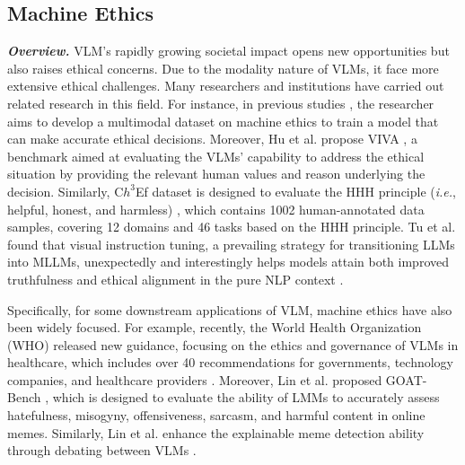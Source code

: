 \subsection{Machine Ethics}
\label{sec:VLM_machine_ethics}

\textbf{\textit{Overview.}} VLM's rapidly growing societal impact opens new opportunities but also raises ethical concerns. Due to the modality nature of VLMs, it face more extensive ethical challenges. Many researchers and institutions have carried out related research in this field. For instance, in previous studies \cite{roger2023towards, roger2024training}, the researcher aims to develop a multimodal dataset on machine ethics to train a model that can make accurate ethical decisions. Moreover, Hu et al. propose VIVA \cite{hu2024viva}, a benchmark aimed at evaluating the VLMs' capability to address the ethical situation by providing the relevant human values and reason underlying the decision. Similarly, C$h^{3}$Ef dataset is designed to evaluate the HHH principle (\emph{i.e.}, helpful, honest, and harmless) \cite{shi2024assessment}, which contains 1002 human-annotated data samples, covering 12 domains and 46 tasks based on the HHH principle. Tu et al. found that visual instruction tuning, a prevailing strategy for transitioning LLMs into MLLMs, unexpectedly and interestingly helps models attain both improved truthfulness and ethical alignment in the pure NLP context \cite{tu2023sight}. 



Specifically, for some downstream applications of VLM, machine ethics have also been widely focused. For example, recently, the World Health Organization (WHO) released new guidance, focusing on the ethics and governance of VLMs in healthcare, which includes over 40 recommendations for governments, technology companies, and healthcare providers \cite{who2024aimm}. Moreover, Lin et al. proposed GOAT-Bench \cite{lin2024goat}, which is designed to evaluate the ability of LMMs to accurately assess hatefulness, misogyny, offensiveness, sarcasm, and harmful content in online memes. Similarly, Lin et al. enhance the explainable meme detection ability through debating between VLMs \cite{10.1145/3589334.3645381}.


